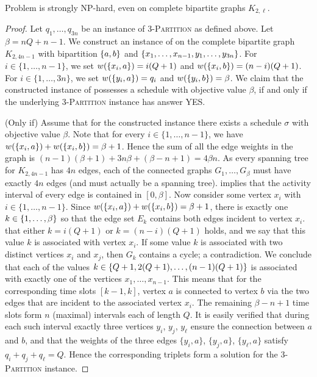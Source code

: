 \begin{theorem}
\label{thm:hardness_complete_bipartite}
Problem {\xxxNTP} is strongly NP-hard, even on complete bipartite graphs $K_{2,\ell}$. 
\end{theorem}
\begin{proof}
Let $q_1,\ldots,q_{3n}$ be an instance of \textsc{3-Partition} as defined above. 
Let $\beta= nQ + n - 1$. 
We construct an instance of {\xxxNTP} on the complete bipartite graph $K_{2,4n-1}$ with bipartition
$\{ a,b \}$ and $\{ x_1, \ldots, x_{n-1}, y_1, \ldots, y_{3n} \}$. 
For $i\in\{1,\ldots,n-1\}$, we set $w(\{ x_i,a \})= i(Q + 1)$ and $w(\{ x_i,b \})= (n-i)(Q+1)$. 
For $i\in\{1,\ldots,3n\}$,  we set $w(\{ y_i,a \})= q_i$      and $w(\{ y_i,b \})= \beta$. 
We claim that the constructed instance of {\xxxNTP} possesses a schedule with objective value $\beta$, 
if and only if the underlying \textsc{3-Partition} instance has answer YES.

(Only if) Assume that for the constructed {\xxxNTP} instance there exists a schedule $\sigma$ 
with objective value $\beta$. 
Note that for every $i \in \{1,\dots,n-1\}$, we have $w(\{ x_i,a \}) +w(\{ x_i,b \}) = \beta+1$. 
Hence the sum of all the edge weights in the graph is $(n-1)(\beta+1) +3n\beta +(\beta-n+1) = 4\beta n$. 
As every spanning tree for $K_{2, 4n-1}$ has $4n$ edges, each of the connected graphs $G_1,\dots,G_\beta$ 
must have exactly $4n$ edges (and must actually be a spanning tree).  implies that the activity interval of every edge is contained in $[0, \beta]$.
Now consider some vertex $x_i$ with $i\in\{1,\dots,n-1\}$. 
Since $w(\{ x_i,a \}) + w(\{ x_i,b \})=\beta+1$, there is exactly one $k\in\{ 1, \ldots, \beta \}$ so 
that the edge set $E_k$ contains both edges incident to vertex $x_i$. 
 that either $k=i(Q+1)$ or $k=(n-i)(Q+1)$ holds, and we say that this value $k$ 
is associated with vertex $x_i$.
If some value $k$ is associated with two distinct vertices $x_i$ and $x_j$, then $G_k$ contains 
a cycle; a contradiction.
We conclude that each of the values $k\in\{ Q+1,2(Q+1),\ldots,(n-1)(Q+1) \}$ is associated with
exactly one of the vertices $x_1,\ldots,x_{n-1}$.
This means that for the corresponding time slots $[k-1,k]$, vertex $a$ is connected to vertex $b$
via the two edges that are incident to the associated vertex $x_i$.
The remaining $\beta-n+1$ time slots form $n$ (maximal) intervals each of length $Q$.
It is easily verified that during each such interval exactly three vertices $y_i$, $y_j$, $y_{\ell}$
ensure the connection between $a$ and $b$, and that the weights of the three edges $\{y_i,a\}$,
$\{y_j,a\}$, $\{y_{\ell},a\}$ satisfy $q_i+q_j+q_{\ell}=Q$.
Hence the corresponding triplets form a solution for the \textsc{3-Partition} instance.


\end{proof}
